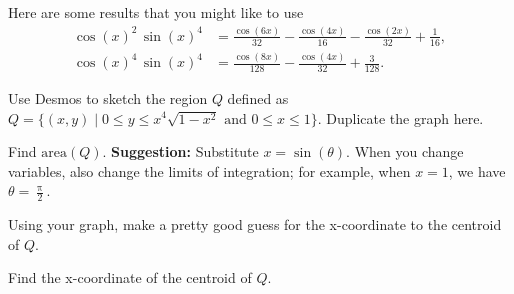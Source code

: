 \documentclass[12pt,fleqn]{exam}
\begin{document}
Here are some results that you might like to use
\begin{align*}
 {{\cos{(x)}}^{2}}\, {{\sin{(x)}}^{4}} &=\frac{\cos{\left( 6 x\right) }}{32}-\frac{\cos{\left( 4 x\right) }}{16}-\frac{\cos{\left( 2 x\right) }}{32}+\frac{1}{16}, \\
 {{\cos{(x)}}^{4}}\, {{\sin{(x)}}^{4}} &=\frac{\cos{\left( 8 x\right) }}{128}-\frac{\cos{\left( 4 x\right) }}{32}+\frac{3}{128}.
\end{align*}
\begin{questions}

    \question[2]  Use Desmos to sketch the region $Q$ defined as $Q = \{(x,y) \mid 0 \leq y \leq x^4 \sqrt{1-x^2}
    \mbox{ and } 0 \leq x \leq 1 \}$. Duplicate
    the graph here.
    \begin{solution}[2.0in]
    \end{solution}
    
    \question[2] Find $\mbox{area}(Q)$. \textbf{Suggestion:} Substitute $x = \sin(\theta)$. When you change variables,
    also change  the limits of integration; for example, when $x=1$, we have $\theta = \frac{\uppi}{2}$.
  \begin{solution}%
    \end{solution}
        \newpage
        \question[2] Using your graph, make a pretty good guess for the x-coordinate to the centroid of $Q$.
  \begin{solution}[1.0in]
    \end{solution}
    

    
       \question[2] Find the x-coordinate of the centroid of $Q$.
  \begin{solution}[2.0in]
    \end{solution}
\end{questions}
\end{document}
